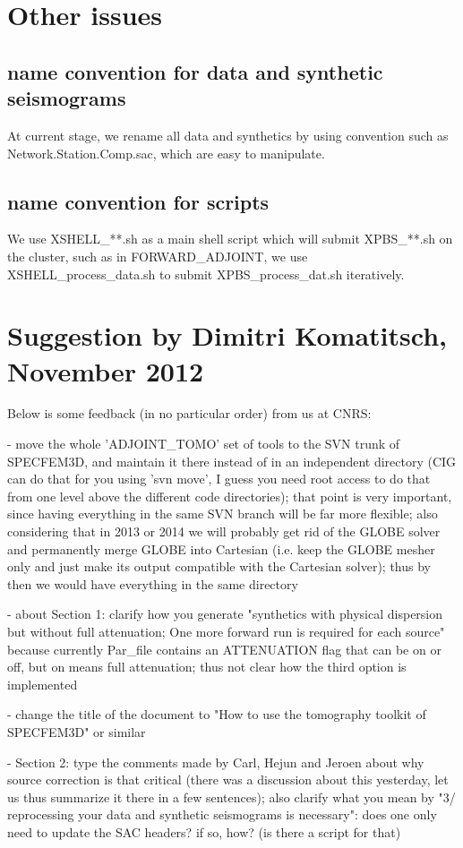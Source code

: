 \documentclass[11pt]{article}
\begin{document}
\section{Other issues}
\subsection{name convention for data and synthetic seismograms}
At current stage, we rename all data and synthetics by using convention such as Network.Station.Comp.sac, which are easy to manipulate.

\subsection{name convention for scripts}
We use XSHELL\_**.sh as a main shell script which will submit XPBS\_**.sh on the cluster, such as in FORWARD\_ADJOINT, we use XSHELL\_process\_data.sh to submit XPBS\_process\_dat.sh iteratively.


\section{Suggestion by Dimitri Komatitsch, November 2012}

Below is some feedback (in no particular order) from us at CNRS:

- move the whole 'ADJOINT\_TOMO' set of tools to the SVN trunk of SPECFEM3D, and maintain it there instead of in an independent directory (CIG can do that for you using 'svn move', I guess you need root access to do that from one level above the different code directories); that point is very important, since having everything in the same SVN branch will be far more flexible; also considering that in 2013 or 2014 we will probably get rid of the GLOBE solver and permanently merge GLOBE into Cartesian (i.e. keep the GLOBE mesher only and just make its output compatible with the Cartesian solver); thus by then we would have everything in the same directory

- about Section 1: clarify how you generate "synthetics with physical dispersion but without full attenuation; One more forward run is required for each source" because currently Par\_file contains an ATTENUATION flag that can be on or off, but on means full attenuation;
thus not clear how the third option is implemented

- change the title of the document to "How to use the tomography toolkit of SPECFEM3D" or similar

- Section 2: type the comments made by Carl, Hejun and Jeroen about why source correction is that critical (there was a discussion about this yesterday, let us thus summarize it there in a few sentences);
also clarify what you mean by "3/ reprocessing your data and synthetic seismograms is necessary": does one only need to update the SAC headers? if so, how? (is there a script for that)
\end{document}
